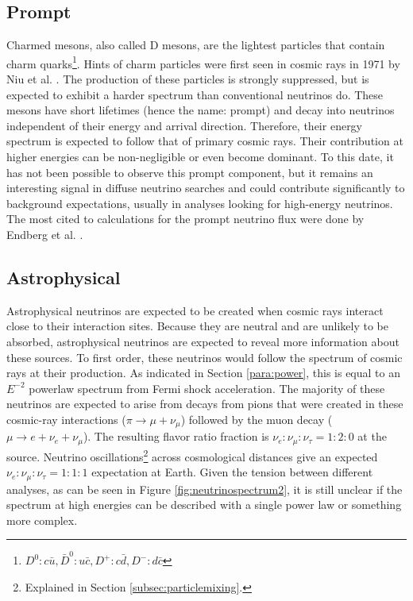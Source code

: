 \subsection{Prompt}
Charmed mesons, also called D mesons, are the lightest particles that contain charm quarks\footnote{$D^0: c\bar{u}, \bar{D}^0: u\bar{c}, D^+: c\bar{d}, D^-: d\bar{c}$}. Hints of charm particles were first seen in cosmic rays in 1971 by Niu et al. \cite{doi:10.1143/PTP.46.1644}. The production of these particles is strongly suppressed, but is expected to exhibit a harder spectrum than conventional neutrinos do. These mesons have short lifetimes (hence the name: prompt) and decay into neutrinos independent of their energy and arrival direction. Therefore, their energy spectrum is expected to follow that of primary cosmic rays. Their contribution at higher energies can be non-negligible or even become dominant. To this date, it has not been possible to observe this prompt component, but it remains an interesting signal in diffuse neutrino searches and could contribute significantly to background expectations, usually in analyses looking for high-energy neutrinos. The most cited to calculations for the prompt neutrino flux were done by Endberg et al. \cite{Enberg:2008te}.
\subsection{Astrophysical}
\label{subsec:astro}
Astrophysical neutrinos are expected to be created when cosmic rays interact close to their interaction sites. Because they are neutral and are unlikely to be absorbed, astrophysical neutrinos are expected to reveal more information about these sources. To first order, these neutrinos would follow the spectrum of cosmic rays at their production. As indicated in Section \ref{para:power}, this is equal to an $E^{-2}$ powerlaw spectrum from Fermi shock acceleration. The majority of these neutrinos are expected to arise from decays from pions that were created in these cosmic-ray interactions ($\pi \rightarrow \mu + \nu_\mu$) followed by the muon decay ($\mu \rightarrow e + \nu_e + \nu_\mu$). The resulting flavor ratio fraction is $\nu_e: \nu_\mu: \nu_\tau = 1:2:0$ at the source. Neutrino oscillations\footnote{Explained in Section \ref{subsec:particlemixing}.} across cosmological distances give an expected $\nu_e: \nu_\mu: \nu_\tau = 1:1:1$ expectation at Earth. Given the tension between different analyses, as can be seen in Figure \ref{fig:neutrinospectrum2}, it is still unclear if the spectrum at high energies can be described with a single power law or something more complex.

